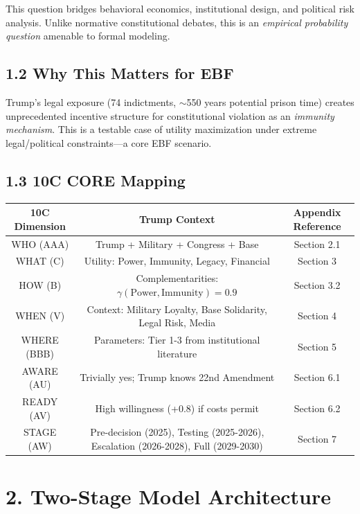 This question bridges behavioral economics, institutional design, and political risk analysis. Unlike normative constitutional debates, this is an \textit{empirical probability question} amenable to formal modeling.

\subsection{1.2 Why This Matters for EBF}

Trump's legal exposure (74 indictments, $\sim$550 years potential prison time) creates unprecedented incentive structure for constitutional violation as an \textit{immunity mechanism}. This is a testable case of utility maximization under extreme legal/political constraints—a core EBF scenario.

\subsection{1.3 10C CORE Mapping}

\begin{table}[h]
\centering
\begin{tabular}{|c|c|c|}
\hline
\textbf{10C Dimension} & \textbf{Trump Context} & \textbf{Appendix Reference} \\
\hline
WHO (AAA) & Trump + Military + Congress + Base & Section 2.1 \\
WHAT (C) & Utility: Power, Immunity, Legacy, Financial & Section 3 \\
HOW (B) & Complementarities: $\gamma(\text{Power}, \text{Immunity}) = 0.9$ & Section 3.2 \\
WHEN (V) & Context: Military Loyalty, Base Solidarity, Legal Risk, Media & Section 4 \\
WHERE (BBB) & Parameters: Tier 1-3 from institutional literature & Section 5 \\
AWARE (AU) & Trivially yes; Trump knows 22nd Amendment & Section 6.1 \\
READY (AV) & High willingness (+0.8) if costs permit & Section 6.2 \\
STAGE (AW) & Pre-decision (2025), Testing (2025-2026), Escalation (2026-2028), Full (2029-2030) & Section 7 \\
\hline
\end{tabular}
\end{table}

\section{2. Two-Stage Model Architecture}


